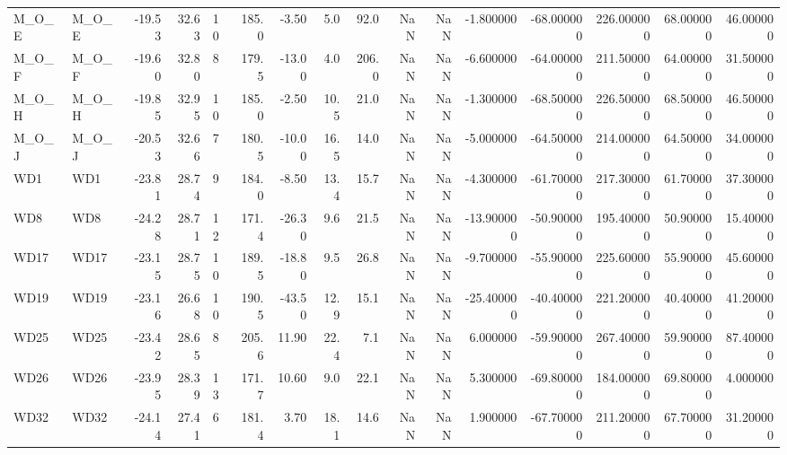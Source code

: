 \documentclass{article}
\begin{document}
{\begin{tabular}{llrrlrrrrrrrrrrr}
M\_O\_E         &                    M\_O\_E &    -19.53 &      32.63 &   10 &   185.0 &   -3.50 &   5.0 &   92.0 &     NaN &         NaN &      -1.800000 & -68.000000 &  226.000000 &     68.000000 &      46.000000 \\
M\_O\_F         &                    M\_O\_F &    -19.60 &      32.80 &    8 &   179.5 &  -13.00 &   4.0 &  206.0 &     NaN &         NaN &      -6.600000 & -64.000000 &  211.500000 &     64.000000 &      31.500000 \\
M\_O\_H         &                    M\_O\_H &    -19.85 &      32.95 &   10 &   185.0 &   -2.50 &  10.5 &   21.0 &     NaN &         NaN &      -1.300000 & -68.500000 &  226.500000 &     68.500000 &      46.500000 \\
M\_O\_J         &                    M\_O\_J &    -20.53 &      32.66 &    7 &   180.5 &  -10.00 &  16.5 &   14.0 &     NaN &         NaN &      -5.000000 & -64.500000 &  214.000000 &     64.500000 &      34.000000 \\
WD1           &                      WD1 &    -23.81 &      28.74 &    9 &   184.0 &   -8.50 &  13.4 &   15.7 &     NaN &         NaN &      -4.300000 & -61.700000 &  217.300000 &     61.700000 &      37.300000 \\
WD8           &                      WD8 &    -24.28 &      28.71 &   12 &   171.4 &  -26.30 &   9.6 &   21.5 &     NaN &         NaN &     -13.900000 & -50.900000 &  195.400000 &     50.900000 &      15.400000 \\
WD17          &                     WD17 &    -23.15 &      28.75 &   10 &   189.5 &  -18.80 &   9.5 &   26.8 &     NaN &         NaN &      -9.700000 & -55.900000 &  225.600000 &     55.900000 &      45.600000 \\
WD19          &                     WD19 &    -23.16 &      26.68 &   10 &   190.5 &  -43.50 &  12.9 &   15.1 &     NaN &         NaN &     -25.400000 & -40.400000 &  221.200000 &     40.400000 &      41.200000 \\
WD25          &                     WD25 &    -23.42 &      28.65 &    8 &   205.6 &   11.90 &  22.4 &    7.1 &     NaN &         NaN &       6.000000 & -59.900000 &  267.400000 &     59.900000 &      87.400000 \\
WD26          &                     WD26 &    -23.95 &      28.39 &   13 &   171.7 &   10.60 &   9.0 &   22.1 &     NaN &         NaN &       5.300000 & -69.800000 &  184.000000 &     69.800000 &       4.000000 \\
WD32          &                     WD32 &    -24.14 &      27.41 &    6 &   181.4 &    3.70 &  18.1 &   14.6 &     NaN &         NaN &       1.900000 & -67.700000 &  211.200000 &     67.700000 &      31.200000 \\

\end{tabular}}
\end{document}
